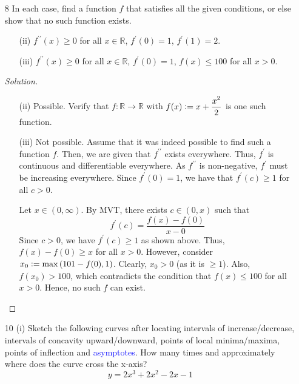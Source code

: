 \documentclass[12pt]{article}
\def\ddfrac#1#2{\displaystyle\frac{\displaystyle #1}{\displaystyle #2}}
\theoremstyle{definition}
\newenvironment{soln}{\begin{proof}[Solution]}{\end{proof}}
\begin{document}
\begin{enumerate}[leftmargin=*]
    \itemsep0.5em
    \item[8] In each case, find a function $f$ that satisfies all the given conditions, or else show that no such function exists.
    \begin{enumerate}
        \item[(ii)] $f^{\prime \prime}(x) \geq 0$ for all $x \in \mathbb{R}$, $f^{\prime}(0) = 1$, $f^{\prime}(1) = 2$.
        \item[(iii)] $f^{\prime\prime}(x) \geq 0$ for all $x \in \mathbb{R}$, $f^{\prime}(0) = 1$, $f(x) \leq 100$ for all $x>0$.
    \end{enumerate}
    
    \medskip
    
    \begin{soln}$ $\par\nobreak\ignorespaces
        \begin{enumerate}[leftmargin=*]
            \item[(ii)] Possible. Verify that $f \colon \mathbb{R} \to \mathbb{R}$ with $f(x) \vcentcolon= x + \ddfrac{x^2}{2}$ is one such function.
            
            \item[(iii)] Not possible. Assume that it was indeed possible to find such a function $f$. Then, we are given that $f^{\prime \prime}$ exists everywhere. Thus, $f^{\prime}$ is continuous and differentiable everywhere. As $f^{\prime \prime}$ is non-negative, $f^{\prime}$ must be increasing everywhere. Since $f^{\prime}(0) = 1$, we have that $f^{\prime}(c) \geq 1$ for all $c>0$.
            
            Let $x \in (0,\infty)$. By MVT, there exists $c \in (0,x)$ such that \[
                f^{\prime}(c) = \frac{f(x) - f(0)}{x - 0}
            \]
            Since $c>0$, we have $f^{\prime}(c) \geq 1$ as shown above. Thus, $f(x) - f(0) \geq x$ for all $x > 0$. However, consider $x_0 \vcentcolon= \max\left(101-f(0), 1\right)$. Clearly, $x_0 > 0$ (as it is $\geq 1$). Also, $f(x_0) > 100$, which contradicts the condition that $f(x) \leq 100$ for all $x>0$. Hence, no such $f$ can exist.
        \end{enumerate}
    \end{soln}
    
    \newpage
    
    \item[10 (i)] Sketch the following curves after locating intervals of increase/decrease, intervals of concavity upward/downward, points of local minima/maxima, points of inflection and \textcolor{blue}{asymptotes}. How many times and approximately where does the curve cross the x-axis?
    \[
        y = 2x^3 + 2x^2 - 2x - 1
    \]
    

\end{enumerate}
\end{document}
